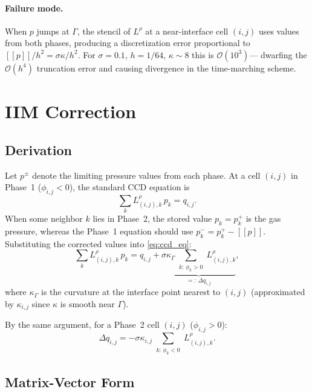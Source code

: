 \documentclass[11pt, a4paper]{article}
\newcommand{\jump}[1]{[\![#1]\!]}
\newcommand{\Ord}[1]{\mathcal{O}(#1)}
\begin{document}
\paragraph{Failure mode.}
When $p$ jumps at $\Gamma$, the stencil of $L^{\rho}$ at a near-interface cell
$(i,j)$ uses values from both phases, producing a discretization error
proportional to $\jump{p}/h^2 = \sigma\kappa/h^2$.
For $\sigma = 0.1$, $h = 1/64$, $\kappa \sim 8$ this is $\Ord{10^3}$---
dwarfing the $\Ord{h^4}$ truncation error and causing divergence in the
time-marching scheme.

\section{IIM Correction}
\label{sec:iim}

\subsection{Derivation}

Let $p^\pm$ denote the limiting pressure values from each phase.
At a cell $(i,j)$ in Phase~1 ($\phi_{i,j} < 0$), the standard CCD equation is
\begin{equation}
  \sum_k L^\rho_{(i,j),k}\, p_k = q_{i,j}. \label{eq:ccd_eq}
\end{equation}
When some neighbor $k$ lies in Phase~2, the stored value $p_k = p_k^+$ is the
gas pressure, whereas the Phase~1 equation should use $p_k^- = p_k^+ - \jump{p}$.
Substituting the corrected values into \eqref{eq:ccd_eq}:
\begin{equation}
  \sum_k L^\rho_{(i,j),k}\, p_k = q_{i,j}
    + \underbrace{\sigma\kappa_\Gamma \sum_{\substack{k:\,\phi_k > 0}} L^\rho_{(i,j),k}}_{=:\,\Delta q_{i,j}},
  \label{eq:corrected}
\end{equation}
where $\kappa_\Gamma$ is the curvature at the interface point nearest to $(i,j)$
(approximated by $\kappa_{i,j}$ since $\kappa$ is smooth near $\Gamma$).

By the same argument, for a Phase~2 cell $(i,j)$ ($\phi_{i,j} > 0$):
\begin{equation}
  \Delta q_{i,j} = -\sigma\kappa_{i,j} \sum_{\substack{k:\,\phi_k < 0}} L^\rho_{(i,j),k}.
  \label{eq:corr_ph2}
\end{equation}

\subsection{Matrix-Vector Form}
\end{document}

